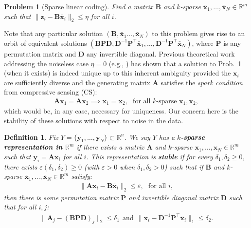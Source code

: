 \documentclass[9pt,twocolumn]{pnas-new}
\newtheorem{problem}{Problem}
\newtheorem{definition}{Definition}
\begin{document}
\begin{problem}[Sparse linear coding]\label{InverseProblem}
Find a matrix $\mathbf{B}$ and $k$-sparse $\mathbf{\bar x}_1, \ldots, \mathbf{\bar x}_N \in \mathbb{R}^m$ such that $\|\mathbf{z}_i - \mathbf{B}\mathbf{\bar x}_i\|_2 \leq \eta$ for all $i$.
\end{problem}

Note that any particular solution $(\mathbf{B}, \mathbf{\bar x}_1 \ldots, \mathbf{\bar x}_N)$ to this problem gives rise to an orbit of equivalent solutions $(\mathbf{BPD}, \mathbf{D}^{-1}\mathbf{P}^{\top}\mathbf{\bar x}_1, \ldots, \mathbf{D}^{-1}\mathbf{P}^{\top}\mathbf{\bar x}_N)$, where $\mathbf{P}$ is any permutation matrix and $\mathbf{D}$ any invertible diagonal. Previous theoretical work addressing the noiseless case $\eta =0$ (e.g., \cite{li2004analysis, Georgiev05, Aharon06, Hillar15}) has shown that a solution to Prob.~\ref{InverseProblem} (when it exists) is indeed unique up to this inherent ambiguity provided the $\mathbf{x}_i$ are sufficiently diverse and the generating matrix $\mathbf{A}$ satisfies the \textit{spark condition} from compressive sensing (CS):
\begin{align}\label{SparkCondition}
\mathbf{A}\mathbf{x}_1 = \mathbf{A}\mathbf{x}_2 \implies \mathbf{x}_1 = \mathbf{x}_2, \ \ \ \text{for all $k$-sparse } \mathbf{x}_1, \mathbf{x}_2,
\end{align}
%
which would be, in any case, necessary for uniqueness. Our concern here is the stability of these solutions with respect to noise in the data.

\begin{definition}\label{maindef}
Fix $Y = \{ \mathbf{y}_1, \ldots, \mathbf{y}_N\} \subset \mathbb{R}^n$. We say $Y$ has a \textbf{$k$-sparse representation in $\mathbb{R}^m$} if there exists a matrix $\mathbf{A}$ and $k$-sparse $\mathbf{x}_1, \ldots, \mathbf{x}_N \in \mathbb{R}^m$ such that $\mathbf{y}_i = \mathbf{A}\mathbf{x}_i$ for all $i$. %
This representation is \textbf{stable} if for every $\delta_1, \delta_2 \geq 0$, there exists $\varepsilon(\delta_1, \delta_2) \geq 0$ (with $\varepsilon > 0$ when  $\delta_1, \delta_2 > 0$) such that if $\mathbf{B}$ and $k$-sparse $\mathbf{\bar x}_1, \ldots, \mathbf{\bar x}_N \in \mathbb{R}^m$ satisfy:
\begin{align*}
\|\mathbf{A}\mathbf{x}_i - \mathbf{B}\mathbf{\bar x}_i\|_2 \leq \varepsilon,\ \ \   \text{for all $i$},
\end{align*}
%
then there is some permutation matrix $\mathbf{P}$ and invertible diagonal matrix $\mathbf{D}$ such that for all $i, j$:
\begin{align}\label{def1}
\|\mathbf{A}_j - (\mathbf{BPD})_j\|_2 \leq \delta_1 \ \ \text{and} \ \ \|\mathbf{x}_i - \mathbf{D}^{-1}\mathbf{P}^{\top}\mathbf{\bar x}_i\|_1 \leq \delta_2.
\end{align}
\end{definition}
\end{document}
